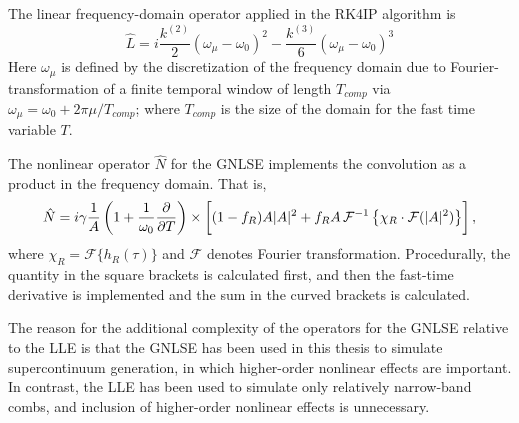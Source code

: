 The linear frequency-domain operator applied in the RK4IP algorithm is
\begin{equation}
\hat{L}=i\frac{k^{(2)}}{2}(\omega_\mu-\omega_0)^2-\frac{k^{(3)}}{6}(\omega_\mu-\omega_0)^3
\end{equation}
Here $\omega_\mu$ is defined by the discretization of the frequency domain due to Fourier-transformation of a finite temporal window of length $T_{comp}$ via $\omega_\mu=\omega_0+2\pi\mu/T_{comp}$; where $T_{comp}$ is the size of the domain for the fast time variable $T$.

The nonlinear operator $\hat{N}$ for the GNLSE implements the convolution as a product in the frequency domain. That is, 
\begin{equation}
\hat{N}=i\gamma\frac{1}{A}\left(1+\frac{1}{\omega_0}\frac{\partial}{\partial T}\right)\times\left[\vphantom{\frac{\partial}{\partial T}}(1-f_R)A|A|^2+f_R A\, \mathcal{F}^{-1}\left\{\chi_R\cdot\mathcal{F}(|A|^2)\right\}\right],
\end{equation}
where $\chi_R=\mathcal{F}\{h_R(\tau)\}$ and $\mathcal{F}$ denotes Fourier transformation. Procedurally, the quantity in the square brackets is calculated first, and then the fast-time derivative is implemented and the sum in the curved brackets is calculated.

The reason for the additional complexity of the operators for the GNLSE relative to the LLE is that the GNLSE has been used in this thesis to simulate supercontinuum generation, in which higher-order nonlinear effects are important. In contrast, the LLE has been used to simulate only relatively narrow-band combs, and inclusion of higher-order nonlinear effects is unnecessary.






